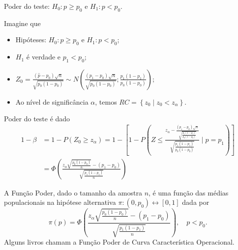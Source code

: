\documentclass[8pt]{beamer}
\begin{document}
\begin{frame}{Poder do teste: $H_0: p \geq p_0$ e $H_1: p < p_0$.}

\scriptsize

Imagine que 
\begin{itemize}
	\item Hipóteses: $H_0:p \geq p_0$ e $H_1: p < p_0$;
	\item $H_1$ é verdade e $p_1 < p_0$;
	\item $Z_0 = \frac{(\hat{p}-p_0)\sqrt{n}}{\sqrt{p_0 (1-p_0)}} \sim N \left( \frac{(p_1 - p_0)\sqrt{n}}{\sqrt{p_0(1-p_0)}}; \frac{p_1(1-p_1)}{p_0(1-p_0)} \right)$;
	\item Ao nível de significância $\alpha$, temos $RC = \left\{ z_0 \mid z_0 < z_{\alpha}  \right\}$.
\end{itemize}

Poder do teste é dado
\begin{align*}
1-\beta &= 1 - P\left( Z_0 \geq z_{\alpha} \right) = 1 - \left[1- P \left( 
Z \leq \frac{ z_{\alpha} - \frac{(p_1 - p_0)\sqrt{n}}{\sqrt{ \frac{p_1(1-p_1)}{p_0(1-p_0)} }} }{ \sqrt{ \frac{p_1(1-p_1)}{p_0(1-p_0)} } }
\mid p = p_1 \right)\right]\\ 
&=  \Phi\left( \frac{ z_{\alpha} \sqrt{ \frac{p_0(1-p_0)}{n}} - (p_1 - p_0)  }{ \sqrt{ \frac{ p_1(1-p_1) }{ n } } } \right) 
\end{align*}

A \textcolor{important}{Função Poder}, dado o tamanho da amostra $n$, é uma função das médias populacionais na hipótese alternativa $\pi: (0, p_0) \longleftrightarrow [0,1] $ dada por
$$\pi(p) = \Phi\left( \frac{ z_{\alpha} \sqrt{ \frac{p_0(1-p_0)}{n}} - (p_1 - p_0)  }{ \sqrt{ \frac{ p_1(1-p_1) }{ n } } } \right) , \quad p < p_0.$$
Alguns livros chamam a Função Poder de \textcolor{important}{Curva Característica Operacional}.

\normalsize

\end{frame}
\end{document}
